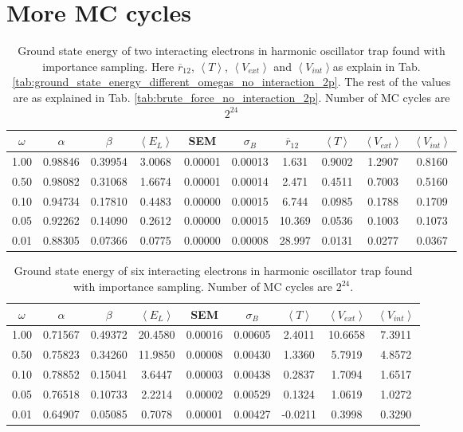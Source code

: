 \section{More MC cycles}

\begin{table}[H]\caption{Ground state energy of two interacting electrons in harmonic oscillator trap found with importance sampling. Here $\overline{r}_{12}$,  $\left< T \right>$, $\left< V_{ext}\right>$  and $\left<V_{int} \right>$as explain in Tab. \ref{tab:ground_state_energy_different_omegas_no_interaction_2p}. The rest of the values are as explained in Tab. \ref{tab:brute_force_no_interaction_2p}. Number of MC cycles are $2^{24}$}\label{tab:ground_state_energy_importance_interaction_MC_24}
\center
\begin{tabular}{c|ccccccccc}
$\omega$ & $\alpha$ & $\beta$ & $\left< E_L \right>$ & SEM & $\sigma_B$ &  $\overline{r}_{12} \,\,\,$ & $\left< T \right>$  & $\left< V_{ext}\right>$ & $\left<V_{int} \right>$  \\ \hline
1.00 & 0.98846 & 0.39954 & 3.0068 & 0.00001 & 0.00013 & 1.631 & 0.9002 & 1.2907 & 0.8160\\
0.50 & 0.98082 & 0.31068 & 1.6674 & 0.00001 & 0.00014 & 2.471 & 0.4511 & 0.7003 & 0.5160\\
0.10 & 0.94734 & 0.17810 & 0.4483 & 0.00000 & 0.00015 & 6.744 & 0.0985 & 0.1788 & 0.1709\\
0.05 & 0.92262 & 0.14090 & 0.2612 & 0.00000 & 0.00015 & 10.369 & 0.0536 & 0.1003 & 0.1073\\
0.01 & 0.88305 & 0.07366 & 0.0775 & 0.00000 & 0.00008 & 28.997 & 0.0131 & 0.0277 & 0.0367\\
\end{tabular}
\end{table}

\begin{table}[H]\caption{Ground state energy of six interacting electrons in harmonic oscillator trap found with importance sampling. Number of MC cycles are $2^{24}$.}\label{tab:ground_state_energy_importance_interaction_6p_MC_24}
\center
\begin{tabular}{c|cccccccc}
$\omega$ & $\alpha$ & $\beta$ & $\left< E_L \right>$ & SEM & $\sigma_B$ &$\left< T \right>$  & $\left< V_{ext}\right>$ & $\left<V_{int} \right>$  \\ \hline
1.00 & 0.71567 & 0.49372 & 20.4580 & 0.00016 & 0.00605 &  2.4011 & 10.6658 & 7.3911\\
0.50 & 0.75823 & 0.34260 & 11.9850 & 0.00008 & 0.00430 &  1.3360 & 5.7919 & 4.8572\\
0.10 & 0.78852 & 0.15041 & 3.6447 & 0.00003 & 0.00438 &  0.2837 & 1.7094 & 1.6517\\
0.05 & 0.76518 & 0.10733 & 2.2214 & 0.00002 & 0.00529 &  0.1324 & 1.0619 & 1.0272\\
0.01 & 0.64907 & 0.05085 & 0.7078 & 0.00001 & 0.00427 &  -0.0211 & 0.3998 & 0.3290\\
\end{tabular}
\end{table}